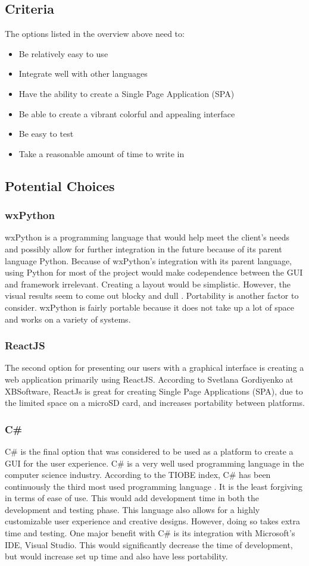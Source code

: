 \documentclass[onecolumn, draftclsnofoot,10pt, compsoc]{IEEEtran}
\begin{document}
\subsection{Criteria}
The options listed in the overview above need to:
\begin{itemize}
	\item Be relatively easy to use
    \item Integrate well with other languages
    \item Have the ability to create a Single Page Application (SPA)
    \item Be able to create a vibrant colorful and appealing interface
    \item Be easy to test
    \item Take a reasonable amount of time to write in
\end{itemize}
\subsection{Potential Choices}
\subsubsection{wxPython}
wxPython is a programming language that would help meet the client's needs and possibly allow for further integration in the future because of its parent language Python. Because of wxPython's integration with its parent language, using Python for most of the project would make codependence between the GUI and framework irrelevant. Creating a layout would be simplistic. However, the visual results seem to come out blocky and dull \cite{wxPython}. Portability is another factor to consider. wxPython is fairly portable because it does not take up a lot of space and works on a variety of systems. 
\subsubsection{ReactJS}
The second option for presenting our users with a graphical interface is creating a web application primarily using ReactJS. According to Svetlana Gordiyenko at XBSoftware, ReactJs is great for creating Single Page Applications (SPA)\cite{React}, due to the limited space on a microSD card, and increases portability between platforms.
\subsubsection{C\#}
C\# is the final option that was considered to be used as a platform to create a GUI for the user experience. C\# is a very well used programming language in the computer science industry. According to the TIOBE index,  C\# has been continuously the third most used programming language \cite{TIOBE}. It is the least forgiving in terms of ease of use. This would add development time in both the development and testing phase. This language also allows for a highly customizable user experience and creative designs. However, doing so takes extra time and testing. One major benefit with C\# is its integration with Microsoft's IDE, Visual Studio. This would significantly decrease the time of development, but would increase set up time and also have less portability.
\end{document}
